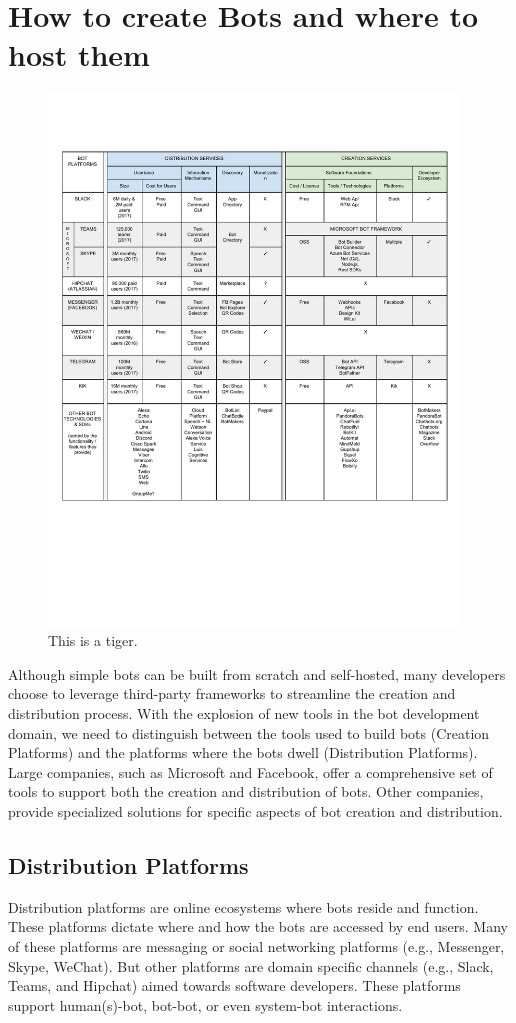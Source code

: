 \documentclass{sig-alternate}
\begin{document}
\section{How to create Bots and where to host them}

	\begin{figure}[ht]
	  \includegraphics[width=\textwidth,height=400pt]{PlatformComparisonTable.pdf}
	  \caption{This is a tiger.}
	\end{figure}

	Although simple bots can be built from scratch and self-hosted, many developers choose to leverage third-party frameworks to streamline the creation and distribution process. With the explosion of new tools in the bot development domain, we need to distinguish between the tools used to build bots (Creation Platforms) and the platforms where the bots dwell (Distribution Platforms).
%
	Large companies, such as Microsoft and Facebook, offer a comprehensive set of tools to support both the creation and distribution of bots. Other companies, provide specialized solutions for specific aspects of bot creation and distribution. 

	\subsection{Distribution Platforms}
	Distribution platforms are online ecosystems where bots reside and function. These platforms dictate where and how the bots are accessed by end users. Many of these platforms are messaging or social networking platforms (e.g., Messenger, Skype, WeChat).  But other platforms are domain specific channels (e.g., Slack, Teams, and Hipchat) aimed towards software developers.  
	These platforms support human(s)-bot, bot-bot, or even system-bot interactions.  
\end{document}
